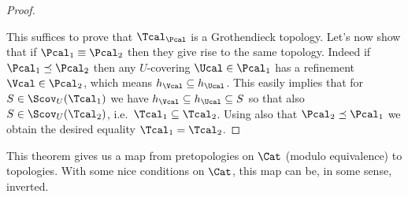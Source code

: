 \documentclass[a4paper]{article}
\begin{document}
\begin{proof}
\begin{enumerate}
                \end{enumerate}
                This suffices to prove that $\Tcal_{\Pcal}$ is a Grothendieck topology. Let's now show that if $\Pcal_1 \equiv \Pcal_2$ then they give rise to the same topology. Indeed if $\Pcal_1 \preceq \Pcal_2$ then any $U$-covering $\Ucal \in \Pcal_1$ has a refinement $\Vcal \in \Pcal_2$, which means $h_{\Vcal} \subseteq h_{\Ucal}$. This easily implies that for $S \in \Scov_U(\Tcal_1)$ we have $h_{\Vcal} \subseteq h_{\Ucal} \subseteq S$ so that also $S \in \Scov_U(\Tcal_2)$, i.e.\ $\Tcal_1 \subseteq \Tcal_2$. Using also that $\Pcal_2 \preceq \Pcal_1$ we obtain the desired equality $\Tcal_1 = \Tcal_2$.
            \end{proof}
            
            This theorem gives us a map from pretopologies on $\Cat$ (modulo equivalence) to topologies. With some nice conditions on $\Cat$, this map can be, in some sense, inverted.
\end{document}
